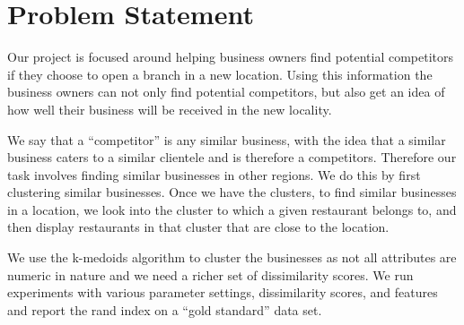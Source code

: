 \documentclass{article}
\begin{document}


\section{Problem Statement}
Our project is focused around helping business owners find potential competitors if they choose to open a branch in a new location.
Using this information the business owners can not only find potential competitors, but also get an idea of how well their business will be received in the new locality.

We say that a ``competitor'' is any similar business, with the idea that a similar business caters to a similar clientele and is therefore a competitors.
Therefore our task involves finding similar businesses in other regions.
We do this by first clustering similar businesses.
Once we have the clusters, to find similar businesses in a location, we look into the cluster to which a given restaurant belongs to, and then display restaurants in that cluster that are close to the location.  

We use the k-medoids algorithm to cluster the businesses as not all attributes are numeric in nature and we need a richer set of dissimilarity scores.
We run experiments with various parameter settings, dissimilarity scores, and features and report the rand index on a ``gold standard'' data set.
\end{document}

